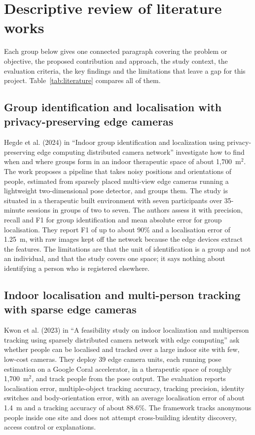 \documentclass[12pt,a4paper,oneside]{report}
\begin{document}
\section{Descriptive review of literature works}\label{sec:lit-desc}
Each group below gives one connected paragraph covering the problem or objective, the proposed contribution and approach, the study context, the evaluation criteria, the key findings and the limitations that leave a gap for this project. Table~\ref{tab:literature} compares all of them.

\clearpage
\subsection{Group identification and localisation with privacy-preserving edge cameras}
Hegde et al. (2024) in ``Indoor group identification and localization using privacy-preserving edge computing distributed camera network'' \cite{ref1} investigate how to find when and where groups form in an indoor therapeutic space of about 1,700~m$^2$. The work proposes a pipeline that takes noisy positions and orientations of people, estimated from sparsely placed multi-view edge cameras running a lightweight two-dimensional pose detector, and groups them. The study is situated in a therapeutic built environment with seven participants over 35-minute sessions in groups of two to seven. The authors assess it with precision, recall and F1 for group identification and mean absolute error for group localisation. They report F1 of up to about 90\% and a localisation error of 1.25~m, with raw images kept off the network because the edge devices extract the features. The limitations are that the unit of identification is a group and not an individual, and that the study covers one space; it says nothing about identifying a person who is registered elsewhere.

\subsection{Indoor localisation and multi-person tracking with sparse edge cameras}
Kwon et al. (2023) in ``A feasibility study on indoor localization and multiperson tracking using sparsely distributed camera network with edge computing'' \cite{ref2} ask whether people can be localised and tracked over a large indoor site with few, low-cost cameras. They deploy 39 edge camera units, each running pose estimation on a Google Coral accelerator, in a therapeutic space of roughly 1,700~m$^2$, and track people from the pose output. The evaluation reports localisation error, multiple-object tracking accuracy, tracking precision, identity switches and body-orientation error, with an average localisation error of about 1.4~m and a tracking accuracy of about 88.6\%. The framework tracks anonymous people inside one site and does not attempt cross-building identity discovery, access control or explanations.
\end{document}
